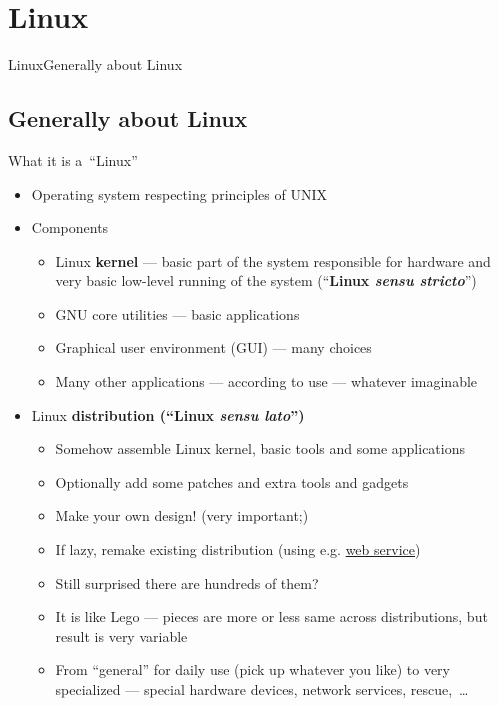 \documentclass[compress, ucs, xelatex, 11pt, xcolor=svgnames, aspectratio=169,
	hyperref={
		bookmarks=true,
		unicode=true,
		colorlinks=true,
		pdftitle={Linux, command line and MetaCentrum},
		plainpages=false,
		pdfauthor={Vojtech Zeisek},
		pdfsubject={Course about use of Linux command line, writing shell scripts and using MetaCentrum of CESNET},
		pdfcreator={XeLaTeX},
		pdfkeywords={Linux, GNU, BASH, shell, command line, MetaCentrum},
		linkcolor=DarkRed, %
		anchorcolor=DarkBlue, %
		citecolor=Indigo, %
		filecolor=NavyBlue, %
		menucolor=DarkMagenta, %
		urlcolor=DarkBlue, %
		pdftex},
	url={hyphens, lowtilde} %
	]{beamer}
\begin{document}
\section{Linux}

\begin{frame}{Linux}{Generally about Linux}
	\tableofcontents[currentsection, sectionstyle=show/hide, hideothersubsections]
\end{frame}

\subsection{Generally about Linux}

\begin{frame}{What it is a~\enquote{Linux}}
	\begin{itemize}
		\item Operating system respecting principles of UNIX
		\item Components
		\begin{itemize}
			\item Linux \textbf{kernel} --- basic part of the system responsible for hardware and very basic low-level running of the system (\enquote{\textbf{Linux \textit{sensu stricto}}})
			\item GNU core utilities --- basic applications
			\item Graphical user environment (GUI) --- many choices
			\item Many other applications --- according to use --- whatever imaginable
		\end{itemize}
		\item Linux \textbf{distribution (\enquote{Linux \textit{sensu lato}})}
		\begin{itemize}
			\item Somehow assemble Linux kernel, basic tools and some applications
			\item Optionally add some patches and extra tools and gadgets
			\item Make your own design! (very important;)
			\item If lazy, remake existing distribution (using e.g. \href{http://openbuildservice.org/}{web service})
			\item Still surprised there are hundreds of them?
			\item It is like Lego --- pieces are more or less same across distributions, but result is very variable
			\item From \enquote{general} for daily use (pick up whatever you like) to very specialized --- special hardware devices, network services, rescue,~\ldots
		\end{itemize}
	\end{itemize}
\end{frame}
\end{document}
